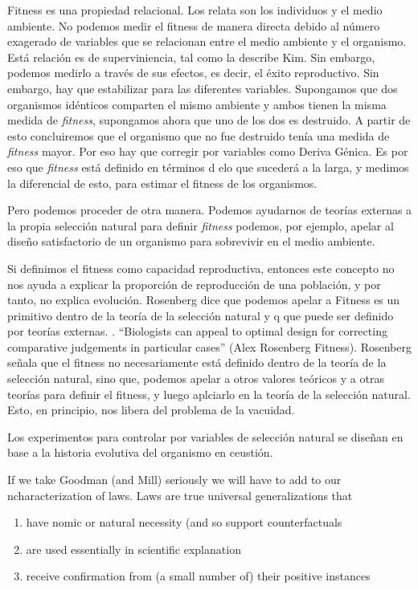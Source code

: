 Fitness es una propiedad relacional. Los relata son los individuos y el medio ambiente. No podemos medir el fitness de manera directa debido al número exagerado de variables que se relacionan entre el medio ambiente y el organismo. Está relación es de superviniencia, tal como la describe Kim. Sin embargo, podemos medirlo a través de sus efectos, es decir, el éxito reproductivo. Sin embargo, hay que estabilizar para las diferentes variables. Supongamos que dos organismos idénticos comparten el mismo ambiente y ambos tienen la misma medida de \emph{fitness}, supongamos ahora que uno de los dos es destruido. A partir de esto concluiremos que el organismo que no fue destruido tenía una medida de \emph{fitness} mayor. Por eso hay que corregir por variables como Deriva Génica. Es por eso que \emph{fitness} está definido en términos d elo que sucederá a la larga, y medimos la diferencial de esto, para estimar el fitness de los organismos.

Pero podemos proceder de otra manera. Podemos ayudarnos de teorías externas a la propia selección natural para definir \emph{fitness} podemos, por ejemplo, apelar al diseño satisfactorio de un organismo para sobrevivir en el medio ambiente.

Si definimos el fitness como capacidad reproductiva, entonces este concepto no nos ayuda a explicar la proporción de reproducción de una población, y por tanto, no explica evolución. Rosenberg dice que podemos apelar a Fitness es un primitivo dentro de la teoría de la selección natural y q  que puede ser definido por teorías externas. . ``Biologists can appeal to optimal design for correcting comparative judgements in particular cases'' (Alex Rosenberg Fitness). Rosenberg señala que el fitness no necesariamente está definido dentro de la teoría de la selección natural, sino que, podemos apelar a otros valores teóricos y a otras teorías para definir el fitness, y luego aplciarlo en la teoría de la selección natural. Esto, en principio, nos libera del problema de la vacuidad.

Los experimentos para controlar por variables de selección natural se diseñan en base a la historia evolutiva del organismo en ceustión.


If we take Goodman (and Mill) seriously we will have to add to our ncharacterization of laws. Laws are true universal generalizations that

\begin{enumerate}
  \item have nomic or natural necessity (and so support counterfactuals
  \item are used essentially in scientific explanation
  \item receive confirmation from (a small number of) their positive instances
  \end{enumerate}


